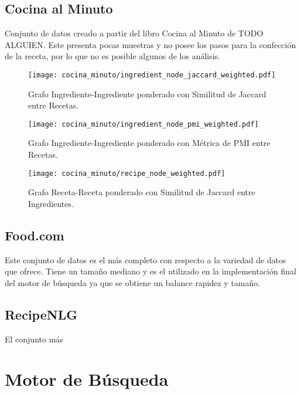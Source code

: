 \documentclass[
	a4paper, %
	10pt, %
	unnumberedsections, %
	twoside, %
]{LTJournalArticle}
\begin{document}
\subsection{Cocina al Minuto}

Conjunto de datos creado a partir del libro Cocina al Minuto de TODO ALGUIEN. Este presenta pocas 
muestras y no posee los pasos para la confección de la receta, por lo que no es posible algunos de 
los análisis.

\begin{figure} %
	\texttt{[image: cocina\_minuto/ingredient\_node\_jaccard\_weighted.pdf]}
	\caption{Grafo Ingrediente-Ingrediente ponderado con Similitud de Jaccard entre Recetas.}
	\label{fig:cocina_minuto_ingredient_jaccard}
\end{figure}

\begin{figure} %
	\texttt{[image: cocina\_minuto/ingredient\_node\_pmi\_weighted.pdf]}
	\caption{Grafo Ingrediente-Ingrediente ponderado con Métrica de PMI entre Recetas.}
	\label{fig:cocina_minuto_ingredient_pmi}
\end{figure}

\begin{figure} %
	\texttt{[image: cocina\_minuto/recipe\_node\_weighted.pdf]}
	\caption{Grafo Receta-Receta ponderado con Similitud de Jaccard entre Ingredientes.}
	\label{fig:cocina_minuto_recipe_pmi}
\end{figure}

\subsection{Food.com}

Este conjunto de datos es el más completo con respecto a la variedad de datos que ofrece. Tiene un tamaño mediano
y es el utilizado en la implementación final del motor de búsqueda ya que se obtiene un balance rapidez y tamaño.

\subsection{RecipeNLG}

El conjunto más 


\section{Motor de Búsqueda}
\end{document}
